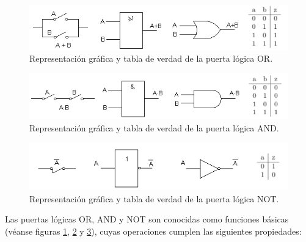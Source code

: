 \documentclass[a4paper, 11pt, titlepage]{article}
\begin{document}
    \begin{figure}[htp]
      \centering
      \includegraphics[width=1\textwidth]{resources/boole-or.png}
      \caption{Representación gráfica y tabla de verdad de la puerta lógica OR.}
      \label{boole-or}
    \end{figure}

    \begin{figure}[htp]
      \centering
      \includegraphics[width=1\textwidth]{resources/boole-and.png}
      \caption{Representación gráfica y tabla de verdad de la puerta lógica AND.}
      \label{boole-and}
    \end{figure}

    \begin{figure}[htp]
      \centering
      \includegraphics[width=1\textwidth]{resources/boole-not.png}
      \caption{Representación gráfica y tabla de verdad de la puerta lógica NOT.}
      \label{boole-not}
    \end{figure}

    Las puertas lógicas OR, AND y NOT son conocidas como funciones básicas (véanse figuras 
    \ref{boole-or}, \ref{boole-and} y \ref{boole-not}), cuyas operaciones cumplen las siguientes 
    propiedades:
\end{document}
